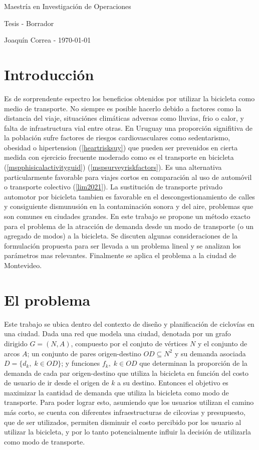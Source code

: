 \documentclass{article}
\begin{document}
  \begin{center}
    {\sc \large Maestría en Investigación de Operaciones}

    {\sc \large Tesis - Borrador}
    \linebreak

    {\rm Joaquín Correa - \today}
  \end{center}

  \section*{Introducción}

  Es de sorprendente espectro los beneficios obtenidos por utilizar la bicicleta como medio de transporte. No siempre es posible hacerlo debido a factores como la distancia del viaje, situaciónes climáticas adversas como lluvias, frio o calor, y falta de infrastructura vial entre otras. En Uruguay una proporción signifitiva de la población sufre factores de riesgos cardiovasculares como sedentarismo, obesidad o hipertension (\ref{heartrisksuy}) que pueden ser prevenidos en cierta medida con ejercicio frecuente moderado como es el transporte en bicicleta (\ref{mspphisicalactivityguid}) (\ref{mspsurveyriskfactors}). Es una alternativa particularmente favorable para viajes cortos en comparación al uso de automóvil o transporte colectivo (\ref{lim2021}). La sustitución de transporte privado automotor por bicicleta tambien es favorable en el descongestionamiento de calles y consiguiente dismunusión en la contaminación sonora y del aire, problemas que son comunes en ciudades grandes. En este trabajo se propone un método exacto para el problema de la atracción de demanda desde un modo de transporte (o un agregado de modos) a la bicicleta. Se discuten algunas consideraciones de la formulación propuesta para ser llevada a un problema lineal y se analizan los parámetros mas relevantes. Finalmente se aplica el problema a la ciudad de Montevideo.

  \section*{El problema}

  Este trabajo se ubica dentro del contexto de diseño y planificación de ciclovías en una ciudad. Dada una red que modela una ciudad, denotada por un grafo dirigido $G=(N,A)$, compuesto por el conjuto de vértices $N$ y el conjunto de arcos $A$; un conjunto de pares origen-destino $OD \subseteq N^2$ y su demanda asociada $D = \{d_k,\; k \in OD\}$; y funciones $f_k,\;k \in OD$ que determinan la proporción de la demanda de cada par origen-destino que utiliza la bicicleta en función del costo de usuario de ir desde el origen de $k$ a su destino. Entonces el objetivo es maximizar la cantidad de demanda que utiliza la bicicleta como modo de transporte. Para poder lograr esto, asumiendo que los usuarios utilizan el camino más corto, se cuenta con diferentes infraestructuras de cilcovias y presupuesto, que de ser utilizados, permiten disminuir el costo percibido por los usuario al utilizar la bicicleta, y por lo tanto potencialmente influir la decisión de utilizarla como modo de transporte.
\end{document}
